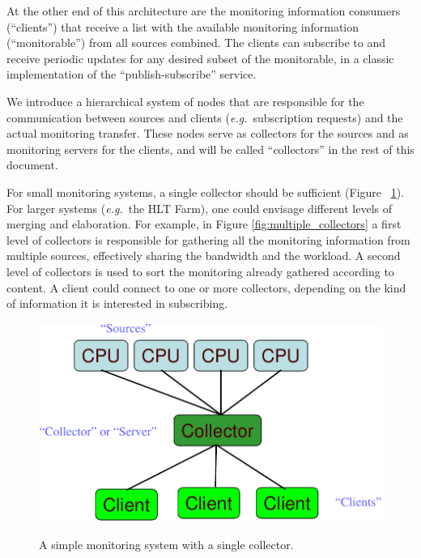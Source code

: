 \documentclass[a4paper]{cmspaper}
\newcommand {\eg}{\mbox{\sl e.g. }}     %
\begin{document}
At the other end of this architecture are the monitoring information
consumers (``clients'') that receive a list with the available monitoring
information (``monitorable'') from all sources combined. The clients can
subscribe to and receive periodic updates for any desired subset of the
monitorable, in a classic implementation of the ``publish-subscribe'' service.

We introduce a hierarchical system of nodes that are responsible for
the communication between sources and clients (\eg subscription
requests) and the actual monitoring transfer. These nodes serve as
collectors for the sources and as monitoring servers for the clients,
and will be called ``collectors'' in the rest of this document.

For small monitoring systems, a single collector should be
sufficient (Figure ~\ref{fig:single_collector}). For larger systems
(\eg the HLT Farm), one could envisage different levels of merging
and elaboration. For example, in Figure \ref{fig:multiple_collectors}
a first level of collectors is responsible for gathering all the
monitoring information from multiple sources, effectively sharing the
bandwidth and the workload. A second level of collectors is used to
sort the monitoring already gathered according to content. A client
could connect to one or more collectors, depending on the kind of
information it is interested in subscribing.
%
\begin{figure}[hbtp]
  \begin{center}
    \resizebox{10cm}{!}
	{\includegraphics{figures/single_collector}} 
\caption{A simple monitoring system with a single collector.}
\label{fig:single_collector}
  \end{center}
\end{figure}
%
\end{document}
